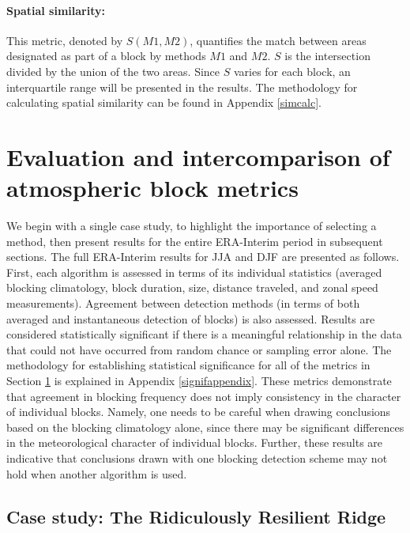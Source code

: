 \documentclass[smallextended]{svjour3}       %
\numberwithin{equation}{section}
\begin{document}
\paragraph{Spatial similarity:} This metric, denoted by $S(M1,M2)$, quantifies the match between areas designated as part of a block by methods $M1$ and $M2$. $S$ is the intersection divided by the union of the two areas. Since $S$ varies for each block, an interquartile range will be presented in the results. The methodology for calculating spatial similarity can be found in Appendix \ref{simcalc}. 

\section{Evaluation and intercomparison of atmospheric block metrics}\label{results}

We begin with a single case study, to highlight the importance of selecting a method, then present results for the entire ERA-Interim period in subsequent sections. The full ERA-Interim results for JJA and DJF are presented as follows. First, each algorithm is assessed in terms of its individual statistics (averaged blocking climatology, block duration, size, distance traveled, and zonal speed measurements). Agreement between detection methods (in terms of both averaged and instantaneous detection of blocks) is also assessed. {\color{blue}Results are considered statistically significant if there is a meaningful relationship in the data that could not have occurred from random chance or sampling error alone. The methodology for establishing statistical significance for all of the metrics in Section \ref{results} is explained in Appendix \ref{signifappendix}.}
These metrics demonstrate that agreement in blocking frequency does not imply consistency in the character of individual blocks.  Namely, one needs to be careful when drawing conclusions based on the blocking climatology alone, since there may be significant differences in the meteorological character of individual blocks.  Further, these results are indicative that conclusions drawn with one blocking detection scheme may not hold when another algorithm is used.

\subsection{Case study: The Ridiculously Resilient Ridge}\label{rrrsec}
\end{document}
